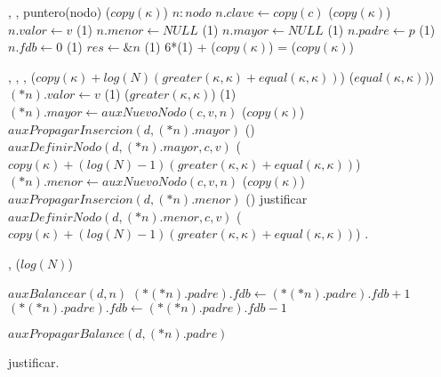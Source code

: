 {   ,
    ,
    }
{puntero(nodo)}
{\bigo($copy(\kappa)$)}
{   \var $n : nodo$
    \State $n.clave \gets copy(c)$              \comment \bigo($copy(\kappa)$)
    \State $n.valor \gets v$                    \comment \bigo(1)
    \State $n.menor \gets NULL$                 \comment \bigo(1)
    \State $n.mayor \gets NULL$                 \comment \bigo(1)
    \State $n.padre \gets p$                    \comment \bigo(1)
    \State $n.fdb \gets 0$                      \comment \bigo(1)
    \State $res \gets \&n$                      \comment \bigo(1)
}
{   6*\bigo(1) + \bigo($copy(\kappa)$) = \bigo($copy(\kappa)$) }

{   ,
    ,
    ,
    }
{}
{\bigo($copy(\kappa)+log(N)(greater(\kappa, \kappa)+equal(\kappa, \kappa))$)}
{                                                  \comment \bigo($equal(\kappa, \kappa)$))
        \State $(*n).valor \gets v$                                     \comment \bigo(1)
    \Else
                                                   \comment \bigo($greater(\kappa, \kappa)$)
                                                \comment \bigo(1)
                \State $(*n).mayor \gets auxNuevoNodo(c, v, n)$         \comment \bigo($copy(\kappa)$)
                \State $auxPropagarInsercion(d, (*n).mayor)$            \comment \bigo(\cuidado)
            \Else
                \State $auxDefinirNodo(d, (*n).mayor, c, v)$            \comment \bigo($copy(\kappa)+(log(N)-1)(greater(\kappa, \kappa)+equal(\kappa, \kappa))$)
            \EndIf
        \Else   
                \State $(*n).menor \gets auxNuevoNodo(c, v, n)$         \comment \bigo($copy(\kappa)$)
                \State $auxPropagarInsercion(d, (*n).menor)$            \comment \bigo(\cuidado) \cuidado justificar            \Else                                                                                                                                                
                \State $auxDefinirNodo(d, (*n).menor, c, v)$            \comment \bigo($copy(\kappa)+(log(N)-1)(greater(\kappa, \kappa)+equal(\kappa, \kappa))$)
            \EndIf
        \EndIf
    \EndIf
}
{   . }


{   ,
    }
{}
{\bigo($log(N)$)}
{   
        \State $auxBalancear(d, n)$
    \Else
                \State $(*(*n).padre).fdb \gets (*(*n).padre).fdb + 1$
            \Else
                \State $(*(*n).padre).fdb \gets (*(*n).padre).fdb - 1$
            \EndIf

                \State $auxPropagarBalance(d, (*n).padre)$
            \EndIf
        \EndIf
    \EndIf
}
{   \cuidado justificar. }



